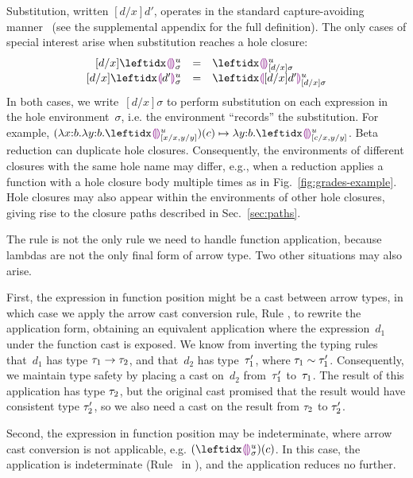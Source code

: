 


Substitution, written $[d/x]d'$, operates in the standard capture-avoiding manner~\cite{pfpl} (see the supplemental appendix for the full definition).
%
The only cases of special interest arise when substitution reaches a hole closure:
\[
\begin{array}{rcl}
  [d/x]\dehole{u}{\sigma}{} & = & \dehole{u}{[d/x]\sigma}{} \\%
  \substitute{d}{x}{\dhole{d'}{u}{\sigma}{}} & = & \dhole{[d/x]d'}{u}{[d/x]\sigma}{}
\end{array}
\]
In both cases, we write~$[d/x]\sigma$ to perform substitution on each expression in the hole environment~$\sigma$, i.e. the environment ``records'' the substitution.
%
For example, $\stepsToD{}
    {\hap{(\halam{x}{b}{\halam{y}{b}{\dehole{u}{[x/x, y/y]}{}}})}{c}}
    {\halam{y}{b}{\dehole{u}{[c/x, y/y]}{}}}$.
%
Beta reduction can duplicate hole closures.
%
Consequently, the environments of different closures with the same hole name may differ,
e.g., when a reduction applies a function with a hole closure body multiple times as in Fig.~\ref{fig:grades-example}.
Hole closures may also appear within the environments of other hole
closures, giving rise to the closure paths described in
Sec.~\ref{sec:paths}.



The  rule is not the only rule we need to handle function
application, because lambdas are not the only final form of arrow type.
%
Two other situations may also arise.

First, the expression in function position might be a cast between
arrow types, in which case we apply the arrow cast conversion rule,
Rule , to rewrite the application form, obtaining an
equivalent application where the expression~$d_1$ under the function
cast is exposed.
%
We know from inverting the typing rules that~$d_1$ has type
$\tau_1 \rightarrow \tau_2$, and that~$d_2$ has type~$\tau_1'$, where
$\tau_1 \sim \tau_1'$.
Consequently, we maintain type
safety by placing a cast on~$d_2$ from~$\tau_1'$ to~$\tau_1$.
%
The result of this application has type $\tau_2$, but the
original cast promised that the result would have consistent type
$\tau_2'$, so we also need a cast on the result from $\tau_2$ to
$\tau_2'$.

Second, the expression in function position may be indeterminate,
where arrow cast conversion is not applicable,
e.g. $\hap{(\dehole{u}{\sigma}{})}{c}$.
%
In this case, the application is indeterminate (Rule~
in ), and the application reduces no
further.

